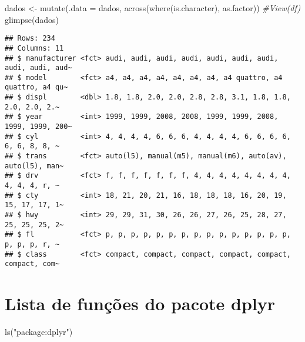 \documentclass[
]{book}
\newenvironment{Shaded}{\begin{snugshade}}{\end{snugshade}}
\newcommand{\AttributeTok}[1]{\textcolor[rgb]{0.77,0.63,0.00}{#1}}
\newcommand{\CommentTok}[1]{\textcolor[rgb]{0.56,0.35,0.01}{\textit{#1}}}
\newcommand{\FunctionTok}[1]{\textcolor[rgb]{0.00,0.00,0.00}{#1}}
\newcommand{\NormalTok}[1]{#1}
\newcommand{\OtherTok}[1]{\textcolor[rgb]{0.56,0.35,0.01}{#1}}
\newcommand{\StringTok}[1]{\textcolor[rgb]{0.31,0.60,0.02}{#1}}
\begin{document}
\begin{Shaded}
\begin{Highlighting}[]
\NormalTok{dados }\OtherTok{\textless{}{-}} \FunctionTok{mutate}\NormalTok{(}\AttributeTok{.data =}\NormalTok{ dados, }
                \FunctionTok{across}\NormalTok{(}\FunctionTok{where}\NormalTok{(is.character), }
\NormalTok{                as.factor))}
\CommentTok{\#View(df) }
\FunctionTok{glimpse}\NormalTok{(dados)}
\end{Highlighting}
\end{Shaded}

\begin{verbatim}
## Rows: 234
## Columns: 11
## $ manufacturer <fct> audi, audi, audi, audi, audi, audi, audi, audi, audi, aud~
## $ model        <fct> a4, a4, a4, a4, a4, a4, a4, a4 quattro, a4 quattro, a4 qu~
## $ displ        <dbl> 1.8, 1.8, 2.0, 2.0, 2.8, 2.8, 3.1, 1.8, 1.8, 2.0, 2.0, 2.~
## $ year         <int> 1999, 1999, 2008, 2008, 1999, 1999, 2008, 1999, 1999, 200~
## $ cyl          <int> 4, 4, 4, 4, 6, 6, 6, 4, 4, 4, 4, 6, 6, 6, 6, 6, 6, 8, 8, ~
## $ trans        <fct> auto(l5), manual(m5), manual(m6), auto(av), auto(l5), man~
## $ drv          <fct> f, f, f, f, f, f, f, 4, 4, 4, 4, 4, 4, 4, 4, 4, 4, 4, r, ~
## $ cty          <int> 18, 21, 20, 21, 16, 18, 18, 18, 16, 20, 19, 15, 17, 17, 1~
## $ hwy          <int> 29, 29, 31, 30, 26, 26, 27, 26, 25, 28, 27, 25, 25, 25, 2~
## $ fl           <fct> p, p, p, p, p, p, p, p, p, p, p, p, p, p, p, p, p, p, r, ~
## $ class        <fct> compact, compact, compact, compact, compact, compact, com~
\end{verbatim}

\hypertarget{lista-de-funuxe7uxf5es-do-pacote-dplyr}{%
\section{Lista de funções do pacote dplyr}\label{lista-de-funuxe7uxf5es-do-pacote-dplyr}}

\begin{Shaded}
\begin{Highlighting}[]
\FunctionTok{ls}\NormalTok{(}\StringTok{"package:dplyr"}\NormalTok{)}
\end{Highlighting}
\end{Shaded}
\end{document}
